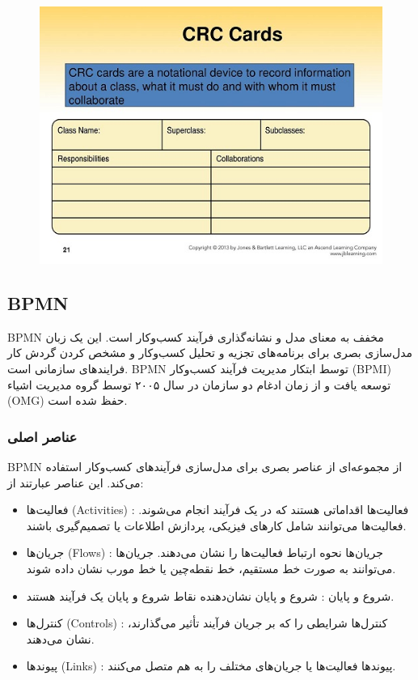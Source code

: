 \begin{figure}[H]
	\centering
	\includegraphics{pic6.jpg}
	\label{fig:label4}
\end{figure}

\subsection*{BPMN}

BPMN مخفف  به معنای مدل و نشانه‌گذاری فرآیند کسب‌وکار است. این یک زبان مدل‌سازی بصری برای برنامه‌های تجزیه و تحلیل کسب‌وکار و مشخص کردن گردش کار فرایندهای سازمانی است. BPMN توسط ابتکار مدیریت فرآیند کسب‌وکار (BPMI) توسعه یافت و از زمان ادغام دو سازمان در سال ۲۰۰۵ توسط گروه مدیریت اشیاء (OMG) حفظ شده ‌است.

\subsubsection*{عناصر اصلی}

BPMN از مجموعه‌ای از عناصر بصری برای مدل‌سازی فرآیندهای کسب‌وکار استفاده می‌کند. این عناصر عبارتند از:

\begin{itemize}
	\item فعالیت‌ها (Activities) : فعالیت‌ها اقداماتی هستند که در یک فرآیند انجام می‌شوند. فعالیت‌ها می‌توانند شامل کارهای فیزیکی، پردازش اطلاعات یا تصمیم‌گیری باشند.
	\item جریان‌ها (Flows) : جریان‌ها نحوه ارتباط فعالیت‌ها را نشان می‌دهند. جریان‌ها می‌توانند به صورت خط مستقیم، خط نقطه‌چین یا خط مورب نشان داده شوند.
	\item شروع و پایان  : شروع و پایان نشان‌دهنده نقاط شروع و پایان یک فرآیند هستند.
	\item کنترل‌ها (Controls) : کنترل‌ها شرایطی را که بر جریان فرآیند تأثیر می‌گذارند، نشان می‌دهند.
	\item پیوندها (Links) : پیوندها فعالیت‌ها یا جریان‌های مختلف را به هم متصل می‌کنند.
\end{itemize}

